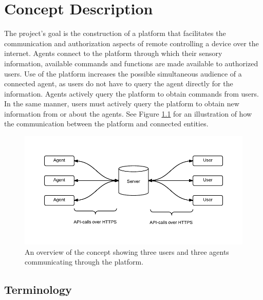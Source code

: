 \chapter{Concept Description}
The project's goal is the construction of a platform that facilitates the communication and authorization aspects of remote controlling a device over the internet.
Agents connect to the platform through which their sensory information, available commands and functions are made available to authorized users.
Use of the platform increases the possible simultaneous audience of a connected agent, as users do not have to query the agent directly for the information. 
Agents actively query the platform to obtain commands from users.
In the same manner, users must actively query the platform to obtain new information from or about the agents.
See Figure \ref{fig:system-overview} for an illustration of how the communication between the platform and connected entities.

\begin{figure}[H]
\begin{center}
	\includegraphics{graphics/system-overview.pdf}
	\caption{An overview of the concept showing three users and three agents communicating through the platform.}
	\label{fig:system-overview}
\end{center}
\end{figure}


\section{Terminology}

